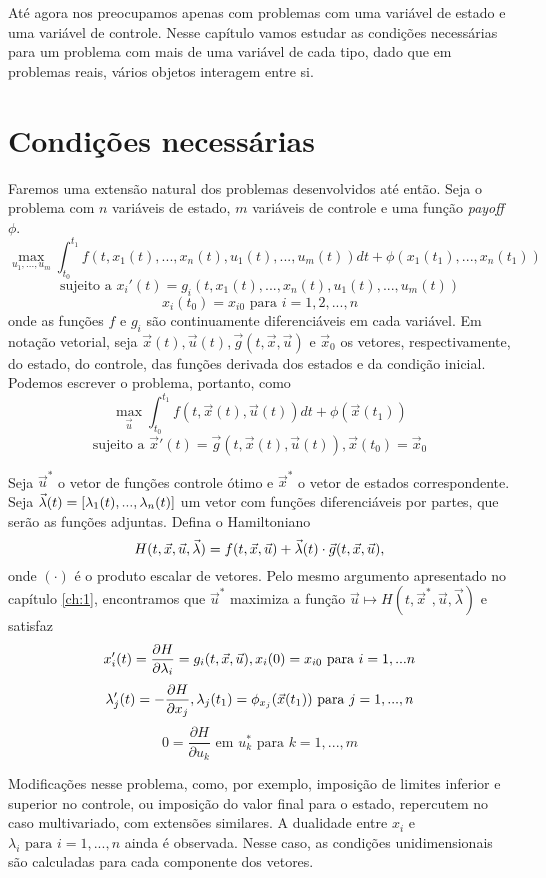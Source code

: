 Até agora nos preocupamos apenas com problemas com uma variável de estado e
uma variável de controle. Nesse capítulo vamos estudar as condições
necessárias para um problema com mais de uma variável de cada tipo, dado que
em problemas reais, vários objetos interagem entre si. 

\section{Condições necessárias}

Faremos uma extensão natural dos problemas desenvolvidos até então. Seja o
problema com $n$ variáveis de estado, $m$ variáveis de controle e uma função
\textit{payoff} $\phi$. 
$$
\max_{u_1,...,u_m} \int_{t_0}^{t_1} f(t,x_1(t),...,x_n(t),u_1(t),...,u_m(t)) dt + \phi(x_1(t_1),...,x_n(t_1))
$$
$$
\text{sujeito a   }x_i'(t) = g_i(t,x_1(t),...,x_n(t),u_1(t),...,u_m(t))
$$
$$
x_i(t_0) = x_{i0} \text{ para }i=1,2,...,n
$$
onde as funções $f$ e $g_i$ são continuamente diferenciáveis em cada variável.
Em notação vetorial, seja $\vec{x}(t), \vec{u}(t), \vec{g}(t,\vec{x},\vec{u})
\text{ e } \vec{x}_0$ os vetores, respectivamente, do estado, do controle, das
funções derivada dos estados e da condição inicial. Podemos escrever o problema,
portanto, como 
$$
\max_{\vec{u}} \int_{t_0}^{t_1} f(t,\vec{x}(t),\vec{u}(t)) dt + \phi(\vec{x}(t_1))
$$
$$
\text{sujeito a   }\vec{x}'(t) = \vec{g}(t,\vec{x}(t), \vec{u}(t)), \vec{x}(t_0) = \vec{x}_{0} 
$$


Seja $\vec{u}^*$ o vetor de funções controle ótimo e $\vec{x}^*$ o vetor de
estados correspondente. Seja $\vec{\lambda}(t) = [\lambda_1(t),...,\lambda_n(t)]$ um vetor
com funções diferenciáveis por partes, que serão as funções adjuntas. Defina o
Hamiltoniano
$$H(t,\vec{x},\vec{u},\vec{\lambda}) = f(t,\vec{x},\vec{u}) + \vec{\lambda}(t)\cdot
\vec{g}(t,\vec{x},\vec{u}),$$
onde $(\cdot)$ é o produto escalar de vetores. Pelo mesmo argumento apresentado
no capítulo \ref{ch:1}, encontramos que $\vec{u}^*$ maximiza a função $\vec{u}
\mapsto H(t, \vec{x}^*, \vec{u}, \vec{\lambda})$ e satisfaz 
$$
x'_i(t) = \frac{\partial H}{\partial \lambda_i} = g_i(t,\vec{x},\vec{u}), x_i(0) = x_{i0} \text{ para }i = 1,...n 
$$
$$
\lambda'_j(t) = - \frac{\partial H}{\partial x_j}, \lambda_j(t_1) = \phi_{x_j}(\vec{x}(t_1)) \text{ para }j=1,...,n
$$
$$
0 = \frac{\partial H}{\partial u_k} \text{ em }u^*_k \text{ para }k=1,...,m
$$

Modificações nesse problema, como, por exemplo, imposição de limites inferior
e superior no controle, ou imposição do valor final para o estado, repercutem
no caso multivariado, com extensões similares. A dualidade entre $x_i$ e
$\lambda_i \text{ para }i=1,...,n$ ainda é observada. Nesse caso, as condições
unidimensionais são calculadas para cada componente dos vetores. 

